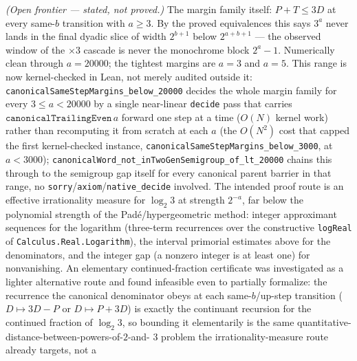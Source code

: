 \begin{theorem}
  \label{thm:collatz-canonical-margins-hold}
  \notready
  \emph{(Open frontier --- stated, not proved.)} The margin family itself:
  \(P+T\le 3D\) at every same-\(b\) transition with \(a\ge3\). By the proved
  equivalences this says \(3^a\) never lands in the final dyadic slice of
  width \(2^{b+1}\) below \(2^{a+b+1}\) --- the observed window of the
  \(\times 3\) cascade is never the monochrome block \(2^a-1\). Numerically
  clean through \(a=20000\); the tightest margins are \(a=3\) and \(a=5\).
  This range is now kernel-checked in Lean, not merely audited outside it:
  \texttt{canonicalSameStepMargins\_below\_20000} decides the whole margin
  family for every \(3\le a<20000\) by a single near-linear \texttt{decide}
  pass that carries \(\texttt{canonicalTrailingEven}\,a\) forward one step at
  a time (\(O(N)\) kernel work) rather than recomputing it from scratch at
  each \(a\) (the \(O(N^2)\) cost that capped the first kernel-checked
  instance, \texttt{canonicalSameStepMargins\_below\_3000}, at \(a<3000\));
  \texttt{canonicalWord\_not\_inTwoGenSemigroup\_of\_lt\_20000} chains this
  through to the semigroup gap itself for every canonical parent barrier in
  that range, no \texttt{sorry}/\texttt{axiom}/\texttt{native\_decide}
  involved. The intended proof route is an effective irrationality measure for
  \(\log_2 3\) at strength \(2^{-a}\), far below the polynomial strength of
  the Pad\'e/hypergeometric method: integer approximant sequences for the
  logarithm (three-term recurrences over the constructive
  \texttt{logReal} of \texttt{Calculus.Real.Logarithm}), the interval
  primorial estimates above for the denominators, and the integer gap
  (a nonzero integer is at least one) for nonvanishing. An elementary
  continued-fraction certificate was investigated as a lighter alternative
  route and found infeasible even to partially formalize: the recurrence the
  canonical denominator obeys at each same-\(b\)/up-step transition
  (\(D\mapsto 3D-P\) or \(D\mapsto P+3D\)) is exactly the continuant
  recursion for the continued fraction of \(\log_2 3\), so bounding it
  elementarily is the same quantitative-distance-between-powers-of-\(2\)-and-
  \(3\) problem the irrationality-measure route already targets, not a

\end{theorem}
